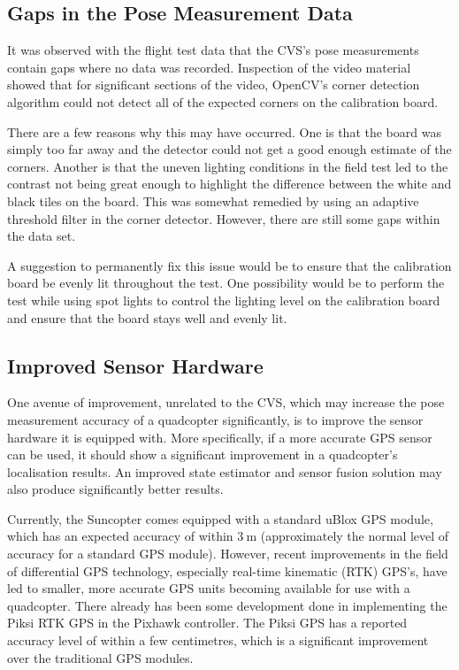 \subsection{Gaps in the Pose Measurement Data}

It was observed with the flight test data that the CVS's pose measurements contain gaps where no data was recorded. Inspection of the video material showed that for significant sections of the video, OpenCV's corner detection algorithm could not detect all of the expected corners on the calibration board. 

There are a few reasons why this may have occurred. One is that the board was simply too far away and the detector could not get a good enough estimate of the corners. Another is that the uneven lighting conditions in the field test led to the contrast not being great enough to highlight the difference between the white and black tiles on the board. This was somewhat remedied by using an adaptive threshold filter in the corner detector. However, there are still some gaps within the data set. 

A suggestion to permanently fix this issue would be to ensure that the calibration board be evenly lit throughout the test. One possibility would be to perform the test while using spot lights to control the lighting level on the calibration board and ensure that the board stays well and evenly lit. 

\subsection{Improved Sensor Hardware}

One avenue of improvement, unrelated to the CVS, which may increase the pose measurement accuracy of a quadcopter significantly, is to improve the sensor hardware it is equipped with. More specifically, if a more accurate GPS sensor can be used, it should show a significant improvement in a quadcopter's localisation results. An improved state estimator and sensor fusion solution may also produce significantly better results. 

Currently, the Suncopter comes equipped with a standard uBlox GPS module, which has an expected accuracy of within $\SI{3}{\m}$ (approximately the normal level of accuracy for a standard GPS module). However, recent improvements in the field of differential GPS technology, especially real-time kinematic (RTK) GPS's, have led to smaller, more accurate GPS units becoming available for use with a quadcopter. There already has been some development done in implementing the Piksi RTK GPS in the Pixhawk controller. The Piksi GPS has a reported accuracy level of within a few centimetres, which is a significant improvement over the traditional GPS modules. 

